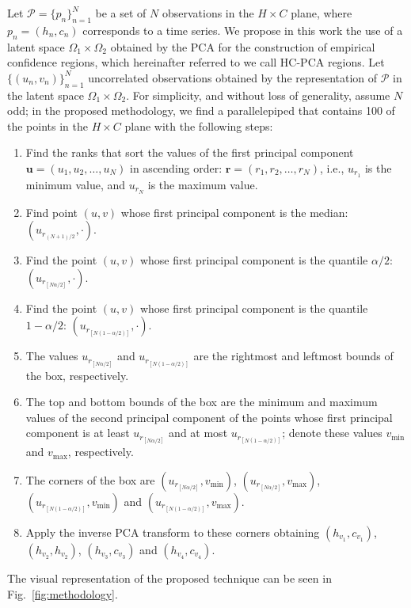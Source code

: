 Let ${\mathcal P} = \{p_n\}_{n = 1}^{N}$ be a set of $N$ observations in the $H \times C$ plane, where ${p_n} = (h_n, c_n)$ corresponds to a time series.
We propose in this work the use of a latent space $\Omega_1 \times \Omega_2$ obtained by the PCA for the construction of empirical confidence regions, which hereinafter referred to we call HC-PCA regions.
Let $\{(u_n, v_n)\}_{n = 1}^N$ uncorrelated observations obtained by the representation of ${\mathcal P}$ in the latent space $\Omega_1 \times \Omega_2$.
For simplicity, and without loss of generality, assume $N$ odd; 
in the proposed methodology, we find a parallelepiped that contains \SI{100}{\minusalphapercent} of the points in the $H \times C$ plane with the following steps:
\begin{enumerate}
    \item Find the ranks that sort the values of the first principal component $\bm u=(u_1,u_2,\dots,u_N)$ in ascending order: $\bm r=(r_1,r_2,\dots,r_N)$, i.e., $u_{r_1}$ is the minimum value, and $u_{r_N}$ is the maximum value.
    \item Find point $(u,v)$ whose first principal component is the median: $(u_{r_{(N+1)/2}}, \cdot)$.
    \item Find the point $(u,v)$ whose first principal component is the quantile $\alpha/2$: $(u_{r_{[N\alpha/2]}}, \cdot)$.
    \item Find the point $(u,v)$ whose first principal component is the quantile $1-\alpha/2$: $(u_{r_{[N(1-\alpha/2)]}}, \cdot)$.
    \item The values $u_{r_{[N\alpha/2]}}$ and $u_{r_{[N(1-\alpha/2)]}}$ are the rightmost and leftmost bounds of the box, respectively.
    \item The top and bottom bounds of the box are the minimum and maximum values of the second principal component of the points whose first principal component is at least $u_{r_{[N\alpha/2]}}$ and at most $u_{r_{[N(1-\alpha/2)]}}$; denote these values $v_{\min}$ and $v_{\max}$, respectively.
    \item The corners of the box are 
    $(u_{r_{[N\alpha/2]}}, v_{\min})$, 
    $(u_{r_{[N\alpha/2]}}, v_{\max})$, 
    $(u_{r_{[N(1-\alpha/2)]}}, v_{\min})$ and 
    $(u_{r_{[N(1-\alpha/2)]}},v_{\max})$.
    \item Apply the inverse PCA transform to these corners obtaining $(h_{v_1}, c_{v_1})$, $(h_{v_2}, h_{v_2})$, $(h_{v_3}, c_{v_3})$ and $(h_{v_4},c_{v_4})$.
\end{enumerate}
The visual representation of the proposed technique can be seen in Fig.~\ref{fig:methodology}.

